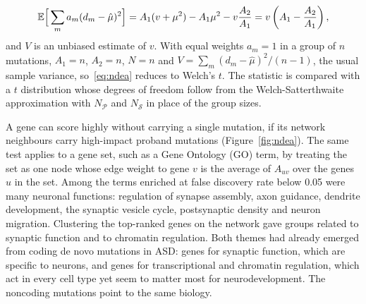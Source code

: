 \begin{equation}
  \mathbb{E}\Big[\sum_ma_m(d_m-\hat\mu)^2\Big] = A_1(v+\mu^2) - A_1\mu^2 - v\frac{A_2}{A_1} = v\left(A_1-\frac{A_2}{A_1}\right),
\end{equation}
and $V$ is an unbiased estimate of $v$. With equal weights $a_m=1$ in a group of $n$ mutations, $A_1=n$, $A_2=n$, $N=n$ and $V=\sum_m(d_m-\hat\mu)^2/(n-1)$, the usual sample variance, so~\eqref{eq:ndea} reduces to Welch's $t$. The statistic is compared with a $t$ distribution whose degrees of freedom follow from the Welch-Satterthwaite approximation with $N_{\mathcal{P}}$ and $N_{\mathcal{S}}$ in place of the group sizes.

A gene can score highly without carrying a single mutation, if its network neighbours carry high-impact proband mutations (Figure~\ref{fig:ndea}). The same test applies to a gene set, such as a Gene Ontology (GO) term, by treating the set as one node whose edge weight to gene $v$ is the average of $A_{u v}$ over the genes $u$ in the set. Among the terms enriched at false discovery rate below 0.05 were many neuronal functions: regulation of synapse assembly, axon guidance, dendrite development, the synaptic vesicle cycle, postsynaptic density and neuron migration. Clustering the top-ranked genes on the network gave groups related to synaptic function and to chromatin regulation. Both themes had already emerged from coding de novo mutations in ASD: genes for synaptic function, which are specific to neurons, and genes for transcriptional and chromatin regulation, which act in every cell type yet seem to matter most for neurodevelopment. The noncoding mutations point to the same biology.

